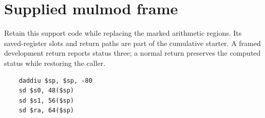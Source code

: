 \section{Supplied mulmod frame}
Retain this support code while replacing the marked arithmetic regions. Its saved-register slots and return paths are part of the cumulative starter. A framed development return reports status three; a normal return preserves the computed status while restoring the caller.

\begin{verbatim}
    daddiu $sp, $sp, -80
    sd $s0, 48($sp)
    sd $s1, 56($sp)
    sd $ra, 64($sp)
\end{verbatim}
